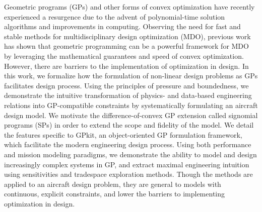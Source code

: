 % 
% 
%


Geometric programs (GPs) and other forms of convex optimization have recently experienced
a resurgence due to the advent of polynomial-time solution algorithms and improvements in computing.
Observing the need for fast and stable methods for multidisciplinary
design optimization (MDO),
previous work has shown that geometric programming can be a powerful framework
for MDO by leveraging the mathematical guarantees
and speed of convex optimization. However, there are barriers to
the implementation of optimization in design.
In this work, we formalize how the formulation
of non-linear design problems as GPs facilitates design process.
Using the principles of pressure and boundedness,
we demonstrate the intuitive transformation of physics- and
data-based engineering relations into GP-compatible constraints by systematically formulating an aircraft
design model. We motivate the difference-of-convex GP extension called signomial programs (SPs)
in order to extend the scope and fidelity of the model.
We detail the features specific to GPkit, an object-oriented GP formulation framework, which
facilitate the modern engineering design process.
Using both performance and mission modeling paradigms, we demonstrate the ability to
model and design increasingly complex systems in GP, and extract maximal engineering intuition
using sensitivities and tradespace exploration methods.
Though the methods are applied to an aircraft design problem, they are general to
models with continuous, explicit constraints, and lower the barriers to implementing
optimization in design.

